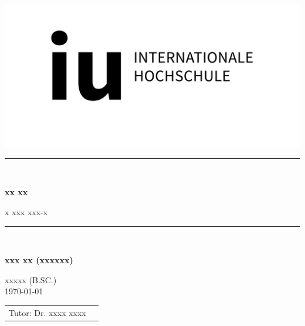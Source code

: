 \def\usesf{}
\newcommand{\HRule}{\rule{\linewidth}{0.1mm}} %

\setlength{\unitlength}{1pt}

\begin{titlepage}

\vspace{-39pt}\hspace*{300pt}\includegraphics[width=.21\paperwidth]{resources/IU_Logo.png}

\begin{center}
\hbox{}
\vfill
{\usesf}

\HRule \\[0.4cm]
{\huge\bfseries xx xx \par}
x xxx xxx-x\\[2mm]
\HRule \\[0.4cm]
\vskip 1cm


{\large\bfseries xxx xx (xxxxxx)\\}

xxxxx (B.SC.) \\
\today %
\vskip 6cm
\begin{tabular}{p{5cm}l}
Tutor: Dr. xxxx xxxx \\
\end{tabular}
\vfill
\end{center}


\end{titlepage}
